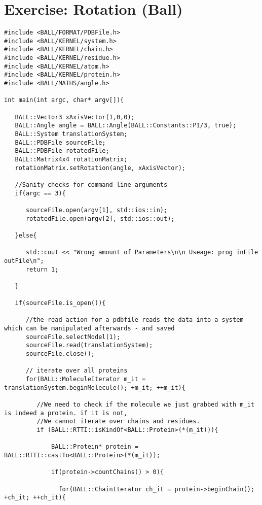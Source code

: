 \documentclass[11pt]{article}
\begin{document}
\date{\today}

\section{Exercise: Rotation (Ball)}

\begin{lstlisting}
#include <BALL/FORMAT/PDBFile.h>
#include <BALL/KERNEL/system.h>
#include <BALL/KERNEL/chain.h>
#include <BALL/KERNEL/residue.h>
#include <BALL/KERNEL/atom.h>
#include <BALL/KERNEL/protein.h>
#include <BALL/MATHS/angle.h>

int main(int argc, char* argv[]){

   BALL::Vector3 xAxisVector(1,0,0);
   BALL::Angle angle = BALL::Angle(BALL::Constants::PI/3, true);
   BALL::System translationSystem;
   BALL::PDBFile sourceFile;
   BALL::PDBFile rotatedFile;
   BALL::Matrix4x4 rotationMatrix;
   rotationMatrix.setRotation(angle, xAxisVector);

   //Sanity checks for command-line arguments
   if(argc == 3){

      sourceFile.open(argv[1], std::ios::in);
      rotatedFile.open(argv[2], std::ios::out);

   }else{

      std::cout << "Wrong amount of Parameters\n\n Useage: prog inFile outFile\n";
      return 1;

   }

   if(sourceFile.is_open()){

      //the read action for a pdbfile reads the data into a system which can be manipulated afterwards - and saved
      sourceFile.selectModel(1);
      sourceFile.read(translationSystem);
      sourceFile.close();

      // iterate over all proteins
      for(BALL::MoleculeIterator m_it = translationSystem.beginMolecule(); +m_it; ++m_it){

         //We need to check if the molecule we just grabbed with m_it is indeed a protein. if it is not,
         //We cannot iterate over chains and residues.
         if (BALL::RTTI::isKindOf<BALL::Protein>(*(m_it))){

             BALL::Protein* protein = BALL::RTTI::castTo<BALL::Protein>(*(m_it));

             if(protein->countChains() > 0){

               for(BALL::ChainIterator ch_it = protein->beginChain(); +ch_it; ++ch_it){


\end{lstlisting}
\end{document}
